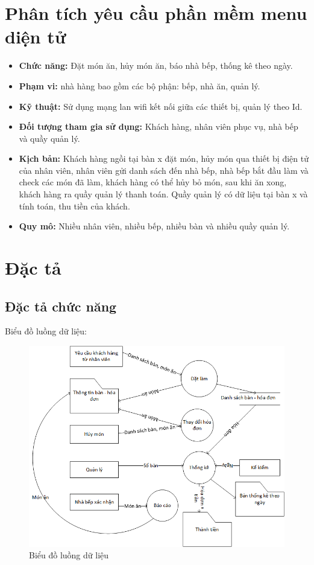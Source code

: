 \documentclass[a4paper,12pt]{report}
\begin{document}
\section{Phân tích yêu cầu phần mềm menu diện tử}
\begin{itemize}
	\item \textbf{Chức năng:} Đặt món ăn, hủy món ăn, báo nhà bếp, thống kê theo ngày.
	\item \textbf{Phạm vi:} nhà hàng bao gồm các bộ phận: bếp, nhà ăn, quản lý.
	\item \textbf{Kỹ thuật:} Sử dụng mạng lan wifi kết nối giữa các thiết bị, quản lý theo Id.
	\item \textbf{Đối tượng tham gia sử dụng:} Khách hàng, nhân viên phục vụ, nhà bếp và quầy quản lý.
	\item \textbf{Kịch bản:} Khách hàng ngồi tại bàn x đặt món, hủy món qua thiết bị điện tử của nhân viên,  nhân viên gửi danh sách đến nhà bếp, nhà bếp bắt đầu làm và check các món đã làm, khách hàng có thể hủy bỏ món, sau khi ăn xong, khách hàng ra quầy quản lý thanh toán. Quầy quản lý có dữ liệu tại bàn x và tính toán, thu tiền của khách.
	\item \textbf{Quy mô:} Nhiều nhân viên, nhiều bếp, nhiều bàn và nhiều quầy quản lý.
\end{itemize}
\section{Đặc tả}
\subsection{Đặc tả chức năng}
Biểu đồ luồng dữ liệu:\\
\begin{figure}[H]
\centering
\includegraphics[scale=0.7]{DFD.png}
\caption{Biểu đồ luồng dữ liệu}
\end{figure}
\end{document}
